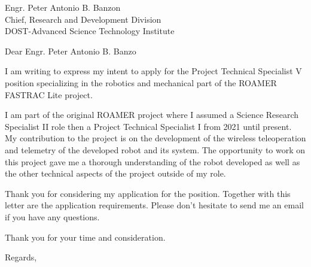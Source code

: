 \documentclass{letter}
\begin{document}
\begin{letter}{Engr. Peter Antonio B. Banzon \\ Chief, Research and Development Division \\ DOST-Advanced Science Technology Institute}
\opening{Dear Engr. Peter Antonio B. Banzo}

I am writing to express my intent to apply for the Project Technical Specialist V position specializing in the robotics and mechanical part of the ROAMER FASTRAC Lite project.  

I am part of the original ROAMER project where I assumed a Science Research Specialist
II role then a Project Technical Specialist I from 2021 until present. My contribution to the
project is on the development of the wireless teleoperation and telemetry of the developed robot and its system. The opportunity to work on this project gave me a thorough understanding of the robot developed as well as the other technical aspects of the project outside of my role. 

Thank you for considering my application for the position.
Together with this letter are the application requirements. Please don’t hesitate to send me an
email if you have any questions.

Thank you for your time and consideration.
\\
\closing{Regards,}





\end{letter}
\end{document}
